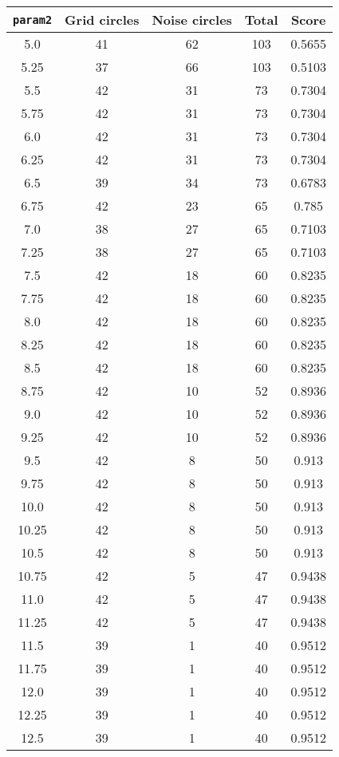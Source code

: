 \documentclass[letterpaper, 12pt]{article}
\begin{document}
\begin{longtable}{|c|c|c|c|c|}
\hline
\textbf{\texttt{param2}} & \textbf{Grid circles} & \textbf{Noise circles} & \textbf{Total} & \textbf{Score} \\
\hline
5.0 & 41 & 62 & 103 & 0.5655 \\
\hline
5.25 & 37 & 66 & 103 & 0.5103 \\
\hline
5.5 & 42 & 31 & 73 & 0.7304 \\
\hline
5.75 & 42 & 31 & 73 & 0.7304 \\
\hline
6.0 & 42 & 31 & 73 & 0.7304 \\
\hline
6.25 & 42 & 31 & 73 & 0.7304 \\
\hline
6.5 & 39 & 34 & 73 & 0.6783 \\
\hline
6.75 & 42 & 23 & 65 & 0.785 \\
\hline
7.0 & 38 & 27 & 65 & 0.7103 \\
\hline
7.25 & 38 & 27 & 65 & 0.7103 \\
\hline
7.5 & 42 & 18 & 60 & 0.8235 \\
\hline
7.75 & 42 & 18 & 60 & 0.8235 \\
\hline
8.0 & 42 & 18 & 60 & 0.8235 \\
\hline
8.25 & 42 & 18 & 60 & 0.8235 \\
\hline
8.5 & 42 & 18 & 60 & 0.8235 \\
\hline
8.75 & 42 & 10 & 52 & 0.8936 \\
\hline
9.0 & 42 & 10 & 52 & 0.8936 \\
\hline
9.25 & 42 & 10 & 52 & 0.8936 \\
\hline
9.5 & 42 & 8 & 50 & 0.913 \\
\hline
9.75 & 42 & 8 & 50 & 0.913 \\
\hline
10.0 & 42 & 8 & 50 & 0.913 \\
\hline
10.25 & 42 & 8 & 50 & 0.913 \\
\hline
10.5 & 42 & 8 & 50 & 0.913 \\
\hline
10.75 & 42 & 5 & 47 & 0.9438 \\
\hline
11.0 & 42 & 5 & 47 & 0.9438 \\
\hline
11.25 & 42 & 5 & 47 & 0.9438 \\
\hline
11.5 & 39 & 1 & 40 & 0.9512 \\
\hline
11.75 & 39 & 1 & 40 & 0.9512 \\
\hline
12.0 & 39 & 1 & 40 & 0.9512 \\
\hline
12.25 & 39 & 1 & 40 & 0.9512 \\
\hline
12.5 & 39 & 1 & 40 & 0.9512 \\

\end{longtable}
\end{document}
